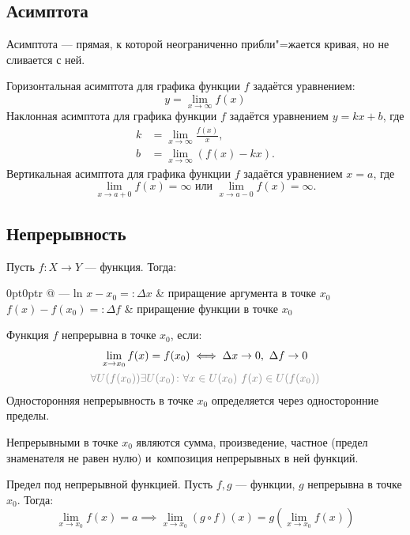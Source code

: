 \subsection{Асимптота}

{\bold Асимптота} --- прямая, к которой {\ital неограниченно} прибли"=жается кривая, но не сливается с ней.

{\ital Горизонтальная асимптота} для графика функции $f$ задаётся уравнением:
$$y=\lim_{x\to\infty}f(x)$$
{\ital Наклонная асимптота} для графика функции $f$ задаётся уравнением $y=kx+b$, где
\begin{align*}
k&=\lim_{x\to\infty}\frac{f(x)}{x},\\
b&=\lim_{x\to\infty}(f(x)-kx).
\end{align*}
{\ital Вертикальная асимптота} для графика функции $f$ задаётся уравнением $x=a$, где
$$\lim_{x\to a+0}f(x)=\infty\text{ или }\lim_{x\to a-0}f(x)=\infty.$$

\subsection{Непрерывность}

Пусть $f\colon X\to Y$ --- функция. Тогда:

\begin{tabularc}{0pt}{0pt}{r @{ --- } l}{n}
$x-x_0=:\Delta x$ & {\ital приращение аргумента} в точке $x_0$\\
$f(x)-f(x_0)=:\Delta f$ & {\ital приращение функции} в точке $x_0$
\end{tabularc}

Функция $f$ {\bold непрерывна} {\ital в точке} $x_0$, если:
$$\begin{gathered}
\lim_{x\to x_0}f(x)=f(x_0)\iff\Delta x\to 0,\ \Delta f\to 0\\
{\color{desc}\forall U(f(x_0))\exists U(x_0)\colon\forall x\in U(x_0)\ f(x)\in U(f(x_0))}
\end{gathered}$$
{\bold Односторонняя непрерывность} в точке $x_0$ определяется через односторонние пределы.

Непрерывными в точке $x_0$ являются {\ital сумма}, {\ital произведение}, {\ital частное {\color{desc}(предел знаменателя не равен нулю)}} и~{\ital композиция} непрерывных в ней функций.

\begin{theorem}
{\bold Предел под непрерывной функцией.} Пусть $f,g$ --- функции, $g$ непрерывна в точке $x_0$. Тогда:
$$\lim_{x\to x_0}f(x)=a\implies\lim_{x\to x_0}(g\circ f)(x)=g(\lim_{x\to x_0}f(x))$$
\end{theorem}

